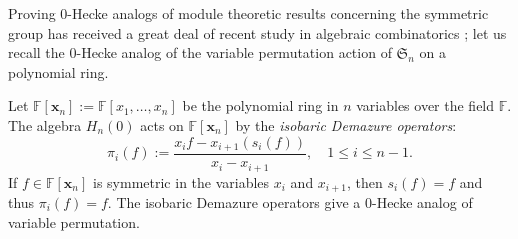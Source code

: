 \documentclass[ALCO,ThmDefs,published]{cedram}
\newcommand{\symm}{{\mathfrak{S}}}
\newcommand{\xx}{{\mathbf {x}}}
\newcommand{\FF}{{\mathbb{F}}}
\theoremstyle{plain}
\newcommand{\symm}{{\mathfrak{S}}}
\newcommand{\FF}{{\mathbb{F}}}
\newcommand{\xx}{{\mathbf {x}}}
\begin{document}
Proving 0-Hecke analogs of  module theoretic results concerning the symmetric group has received
a great deal of recent study in algebraic combinatorics \cite{BBSSZ, Huang, HuangTab, VT}; let us 
recall the 0-Hecke analog of the variable permutation action of $\symm_n$ on a polynomial ring.

Let $\FF[\xx_n] := \FF[x_1, \dots, x_n]$ be the polynomial ring in $n$ variables over the field $\FF$.
The algebra $H_n(0)$ acts on $\FF[\xx_n]$ by the \emph{isobaric Demazure operators}:
\begin{equation}\label{Demazure}
\pi_i(f) := \frac{x_i f - x_{i+1} (s_i(f))}{x_i - x_{i+1}},\quad 1\le i\le n-1.
\end{equation}
If $f \in \FF[\xx_n]$ is symmetric in the variables $x_i$ and $x_{i+1}$, then $s_i(f) = f$ and thus $\pi_i(f) = f$.
The isobaric Demazure operators give a 0-Hecke analog of variable permutation.
\end{document}
